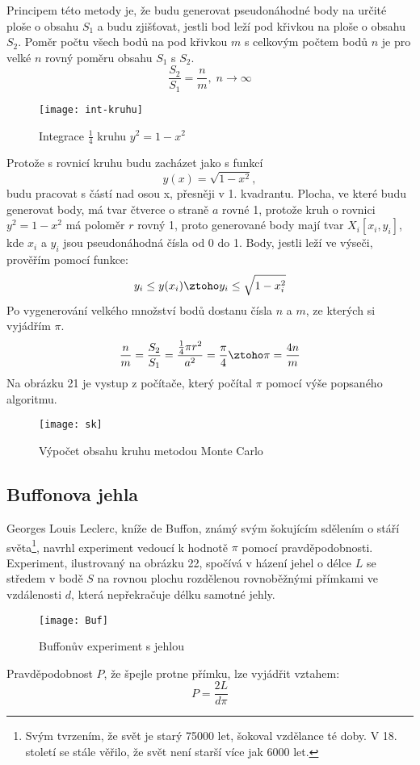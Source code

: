 \documentclass[soc]{gzwroc} %
\begin{document}
Principem této metody je, že budu generovat pseudonáhodné body na určité ploše o obsahu $S_1$ a budu zjišťovat, jestli bod leží pod křivkou na ploše o obsahu $S_2$. Poměr počtu všech bodů na pod křivkou $m$ s celkovým počtem bodů $n$ je pro velké $n$ rovný poměru obsahu $S_1$ s $S_2$.
\begin{equation}
\frac{S_2}{S_1}=\frac{n}{m}, \; n\rightarrow\infty
\end{equation}
\begin{figure}[!ht]
\texttt{[image: int-kruhu]}
\caption{Integrace $\frac{1}{4}$ kruhu $y^2={1-x^2}$}
\label{fig:kruh}
\end{figure}
Protože s rovnicí kruhu budu zacházet jako s funkcí $$y(x)=\sqrt{1-x^2},$$ budu pracovat s částí nad osou x, přesněji v 1. kvadrantu. Plocha, ve které budu generovat body, má tvar čtverce o straně $a$ rovné 1, protože kruh o rovnici $y^2={1-x^2}$ má poloměr $r$ rovný 1, proto generované body mají tvar $X_i[x_i, y_i]$, kde $x_i$ a $y_i$ jsou pseudonáhodná čísla od 0 do 1. Body, jestli leží ve výseči, prověřím pomocí funkce:
$$
y_i\leq y(x_i) \ztoho y_i \leq\sqrt{1-x_i^2}
$$
Po vygenerování velkého množství bodů dostanu čísla $n$ a $m$, ze kterých si vyjádřím $\pi$.
\begin{equation}
\frac{n}{m}=\frac{S_2}{S_1}=\frac{\frac{1}{4}\pi r^2}{a^2}=\frac{\pi}{4} \ztoho \pi=\frac{4n}{m}
\end{equation}
Na obrázku 21 je vystup z počítače, který počítal $\pi$ pomocí výše popsaného algoritmu.
\begin{figure}[!ht]
\texttt{[image: sk]}
\caption{Výpočet obsahu kruhu metodou Monte Carlo}
\label{fig:graf1}
\end{figure}

\subsection{Buffonova jehla}
Georges Louis Leclerc, kníže de Buffon, známý svým šokujícím sdělením o stáří světa\footnote[10]{Svým tvrzením, že svět je starý 75000 let, šokoval vzdělance té doby. V 18. století se stále věřilo, že svět není starší více jak 6000 let.}, navrhl experiment vedoucí k hodnotě $\pi$ pomocí pravděpodobnosti. Experiment, ilustrovaný na obrázku 22, spočívá v házení jehel o délce $L$ se středem v bodě $S$ na rovnou plochu rozdělenou rovnoběžnými přímkami ve vzdálenosti $d$, která nepřekračuje délku samotné jehly.
\begin{figure}[!ht]
\texttt{[image: Buf]}
\caption{Buffonův experiment s jehlou}
\label{fig:kruh}
\end{figure}
Pravděpodobnost $P$, že špejle protne přímku, lze vyjádřit vztahem:
\begin{equation}
P=\frac{2L}{d\pi}
\end{equation}
\end{document}
